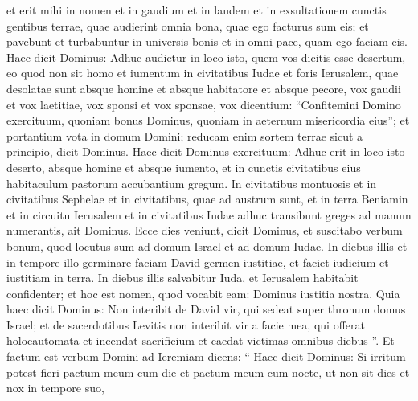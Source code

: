 \begin{biblechapter}
\begin{biblechapter}
\begin{biblechapter}
\begin{biblechapter}
\begin{biblechapter}
\begin{biblechapter}
\begin{biblechapter}
\begin{biblechapter}
\begin{biblechapter}
\begin{biblechapter}
\begin{biblechapter}
\begin{biblechapter}
\begin{biblechapter}
\begin{biblechapter}
\begin{biblechapter}
\begin{biblechapter}
\begin{biblechapter}
\begin{biblechapter}
\begin{biblechapter}
\begin{biblechapter}
\begin{biblechapter}
\begin{biblechapter}
\begin{biblechapter}
\begin{biblechapter}
\begin{biblechapter}
\begin{biblechapter}
\begin{biblechapter}
\begin{biblechapter}
\begin{biblechapter}
\begin{biblechapter}
\begin{biblechapter}
\begin{biblechapter}
\begin{biblechapter}
\verse et erit mihi in nomen et in gaudium et in laudem et in exsultationem cunctis gentibus terrae, quae audierint omnia bona, quae ego facturus sum eis; et pavebunt et turbabuntur in universis bonis et in omni pace, quam ego faciam eis.
 \verse Haec dicit Dominus: Adhuc audietur in loco isto, quem vos dicitis esse desertum, eo quod non sit homo et iumentum in civitatibus Iudae et foris Ierusalem, quae desolatae sunt absque homine et absque habitatore et absque pecore, 
\verse vox gaudii et vox laetitiae, vox sponsi et vox sponsae, vox dicentium:
 “Confitemini Domino exercituum, quoniam bonus Dominus,
 quoniam in aeternum misericordia eius”;
 et portantium vota in domum Domini; reducam enim sortem terrae sicut a principio, dicit Dominus.
 \verse Haec dicit Dominus exercituum: Adhuc erit in loco isto deserto, absque homine et absque iumento, et in cunctis civitatibus eius habitaculum pastorum accubantium gregum. 
\verse In civitatibus montuosis et in civitatibus Sephelae et in civitatibus, quae ad austrum sunt, et in terra Beniamin et in circuitu Ierusalem et in civitatibus Iudae adhuc transibunt greges ad manum numerantis, ait Dominus.
 \verse Ecce dies veniunt, dicit Dominus, et suscitabo verbum bonum, quod locutus sum ad domum Israel et ad domum Iudae. 
\verse In diebus illis et in tempore illo germinare faciam David germen iustitiae, et faciet iudicium et iustitiam in terra. 
\verse In diebus illis salvabitur Iuda, et Ierusalem habitabit confidenter; et hoc est nomen, quod vocabit eam: Dominus iustitia nostra. 
\verse Quia haec dicit Dominus: Non interibit de David vir, qui sedeat super thronum domus Israel; 
\verse et de sacerdotibus Levitis non interibit vir a facie mea, qui offerat holocautomata et incendat sacrificium et caedat victimas omnibus diebus ”.
 \verse Et factum est verbum Domini ad Ieremiam dicens: 
\verse “ Haec dicit Dominus: Si irritum potest fieri pactum meum cum die et pactum meum cum nocte, ut non sit dies et nox in tempore suo, 

\end{biblechapter}
\end{biblechapter}
\end{biblechapter}
\end{biblechapter}
\end{biblechapter}
\end{biblechapter}
\end{biblechapter}
\end{biblechapter}
\end{biblechapter}
\end{biblechapter}
\end{biblechapter}
\end{biblechapter}
\end{biblechapter}
\end{biblechapter}
\end{biblechapter}
\end{biblechapter}
\end{biblechapter}
\end{biblechapter}
\end{biblechapter}
\end{biblechapter}
\end{biblechapter}
\end{biblechapter}
\end{biblechapter}
\end{biblechapter}
\end{biblechapter}
\end{biblechapter}
\end{biblechapter}
\end{biblechapter}
\end{biblechapter}
\end{biblechapter}
\end{biblechapter}
\end{biblechapter}
\end{biblechapter}
